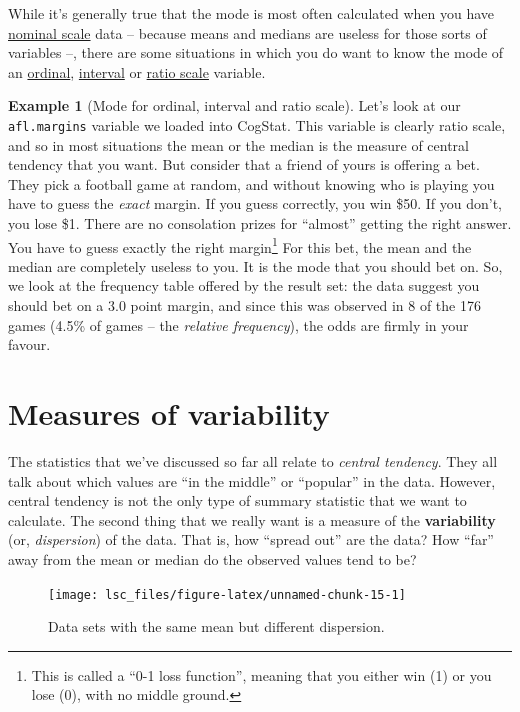 \documentclass[
]{book}
\theoremstyle{definition}
\theoremstyle{definition}
\newtheorem{example}{Example}[chapter]
\theoremstyle{definition}
\theoremstyle{definition}
\theoremstyle{remark}
\begin{document}
While it's generally true that the mode is most often calculated when you have \protect\hyperlink{nominalscale}{nominal scale} data -- because means and medians are useless for those sorts of variables --, there are some situations in which you do want to know the mode of an \protect\hyperlink{ordinalscale}{ordinal}, \protect\hyperlink{intervalscale}{interval} or \protect\hyperlink{ratioscale}{ratio scale} variable.

\begin{example}[Mode for ordinal, interval and ratio scale]
\protect\hypertarget{exm:exmode2}{}\label{exm:exmode2}Let's look at our \texttt{afl.margins} variable we loaded into CogStat. This variable is clearly ratio scale, and so in most situations the mean or the median is the measure of central tendency that you want. But consider that a friend of yours is offering a bet. They pick a football game at random, and without knowing who is playing you have to guess the \emph{exact} margin. If you guess correctly, you win \$50. If you don't, you lose \$1. There are no consolation prizes for ``almost'' getting the right answer. You have to guess exactly the right margin\footnote{This is called a ``0-1 loss function'', meaning that you either win (1) or you lose (0), with no middle ground.} For this bet, the mean and the median are completely useless to you. It is the mode that you should bet on. So, we look at the frequency table offered by the result set: the data suggest you should bet on a \(3.0\) point margin, and since this was observed in 8 of the 176 games (4.5\% of games -- the \emph{relative frequency}), the odds are firmly in your favour.
\end{example}

\hypertarget{var}{%
\section{Measures of variability}\label{var}}

The statistics that we've discussed so far all relate to \emph{central tendency}. They all talk about which values are ``in the middle'' or ``popular'' in the data. However, central tendency is not the only type of summary statistic that we want to calculate. The second thing that we really want is a measure of the \textbf{variability} (or, \emph{dispersion}) of the data. That is, how ``spread out'' are the data? How ``far'' away from the mean or median do the observed values tend to be?

\begin{figure}

{\centering \texttt{[image: lsc\_files/figure-latex/unnamed-chunk-15-1]} 

}

\caption{Data sets with the same mean but different dispersion.}\label{fig:unnamed-chunk-15}
\end{figure}
\end{document}
